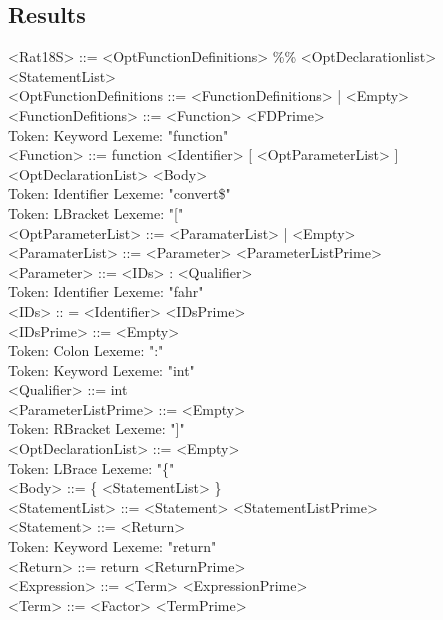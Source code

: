 \documentclass[11pt]{article}
\begin{document}
\subsection*{Results}
\label{sec-1-1}
<Rat18S> ::= <OptFunctionDefinitions> \%\% <OptDeclarationlist>
        <StatementList> \\
        <OptFunctionDefinitions ::= <FunctionDefinitions> | <Empty> \\
        <FunctionDefitions> ::= <Function> <FDPrime> \\
Token: Keyword   Lexeme: "function" \\
        <Function> ::= function <Identifier> [ <OptParameterList> ]
        <OptDeclarationList> <Body> \\
Token: Identifier        Lexeme: "convert\$" \\
Token: LBracket          Lexeme: "[" \\
        <OptParameterList> ::= <ParamaterList> | <Empty> \\
        <ParamaterList> ::= <Parameter> <ParameterListPrime> \\
        <Parameter> ::= <IDs> : <Qualifier> \\
Token: Identifier        Lexeme: "fahr" \\
        <IDs> :: = <Identifier> <IDsPrime> \\
        <IDsPrime> ::= <Empty> \\
Token: Colon     Lexeme: ":" \\
Token: Keyword   Lexeme: "int" \\
        <Qualifier> ::= int \\
        <ParameterListPrime> ::= <Empty> \\
Token: RBracket          Lexeme: "]" \\
        <OptDeclarationList> ::= <Empty> \\
Token: LBrace    Lexeme: "\{" \\
        <Body> ::= \{ <StatementList> \} \\
        <StatementList> ::= <Statement> <StatementListPrime> \\
        <Statement> ::= <Return> \\
Token: Keyword   Lexeme: "return" \\
        <Return> ::= return <ReturnPrime> \\
        <Expression> ::= <Term> <ExpressionPrime> \\
        <Term> ::= <Factor> <TermPrime> \\
\end{document}
